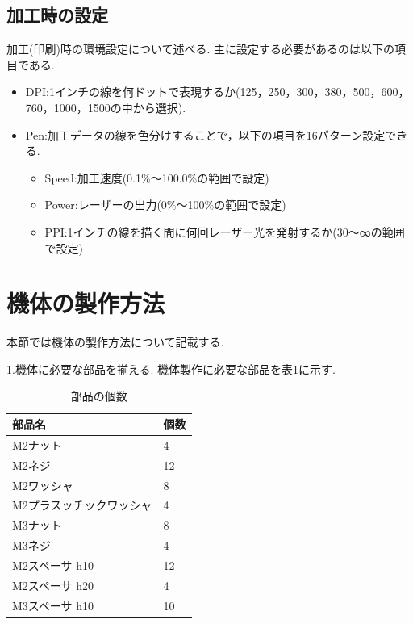 \documentclass[12pt,oneside]{sotsuken_paper}
\begin{document}
\subsection{加工時の設定}
加工(印刷)時の環境設定について述べる.
主に設定する必要があるのは以下の項目である.

\begin{itemize}
	\item DPI:1インチの線を何ドットで表現するか(125，250，300，380，500，600，760，1000，1500の中から選択).
	\item Pen:加工データの線を色分けすることで，以下の項目を16パターン設定できる.
		\begin{itemize}
			\item Speed:加工速度(0.1\%～100.0\%の範囲で設定)
			\item Power:レーザーの出力(0\%～100\%の範囲で設定)
			\item PPI:1インチの線を描く間に何回レーザー光を発射するか(30～∞の範囲で設定)
		\end{itemize}
\end{itemize}

\section{機体の製作方法}
本節では機体の製作方法について記載する.


1.機体に必要な部品を揃える.
機体製作に必要な部品を表\ref{table:kitai}に示す.

\begin{table}[htbp]
	\begin{center}
		\caption{部品の個数}
		\begin{tabular}{|l|l|} \hline
			部品名 & 個数 \\ \hline
			M2ナット & 4 \\ \hline
			M2ネジ & 12 \\ \hline
			M2ワッシャ & 8 \\ \hline
			M2プラスッチックワッシャ & 4 \\ \hline
			M3ナット & 8 \\ \hline
			M3ネジ & 4 \\ \hline
			M2スペーサ h10 & 12 \\ \hline
			M2スペーサ h20 & 4 \\ \hline
			M3スペーサ h10 & 10 \\ \hline
		\end{tabular}
		\label{table:kitai}
	\end{center}
\end{table}
\end{document}
